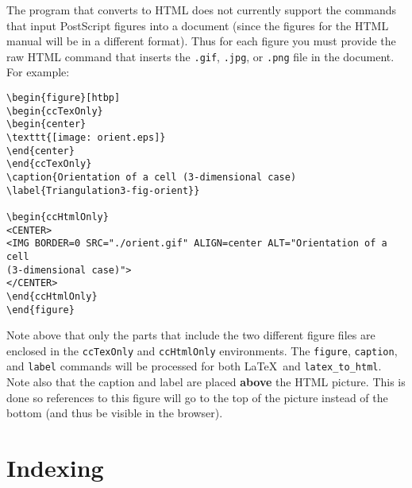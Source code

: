 The program that converts to HTML does not currently support
the commands that input PostScript figures into a document (since the figures
for the HTML manual will be in a different format).  Thus for each figure
you must provide the raw HTML command that inserts the {\tt .gif},
{\tt .jpg}, or {\tt .png} file in the
document.  For example: 

\begin{verbatim}
\begin{figure}[htbp]
\begin{ccTexOnly}
\begin{center}
\texttt{[image: orient.eps]}
\end{center}
\end{ccTexOnly}
\caption{Orientation of a cell (3-dimensional case)
\label{Triangulation3-fig-orient}}

\begin{ccHtmlOnly}
<CENTER>
<IMG BORDER=0 SRC="./orient.gif" ALIGN=center ALT="Orientation of a cell
(3-dimensional case)">
</CENTER>
\end{ccHtmlOnly}
\end{figure}
\end{verbatim}

Note above that only the parts that include the two different figure files
are enclosed in the {\tt ccTexOnly} and {\tt ccHtmlOnly} environments.
The {\tt figure}, {\tt caption}, and {\tt label} commands will be processed
for both \LaTeX\  and {\tt latex\_to\_html}.
Note also that the caption and label are placed {\bf above} the HTML picture.  
This is done so references to this figure will go to the top of the picture
instead of the bottom (and thus be visible in the browser).


\section{Indexing}
\label{sec:indexing}

